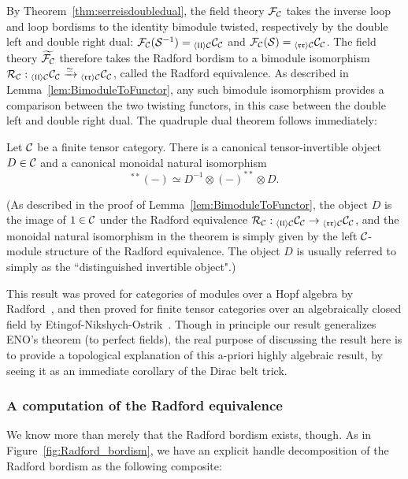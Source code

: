 \documentclass{amsart}
\begin{document}
By Theorem~\ref{thm:serreisdoubledual}, the field theory $\mathcal F_\mathcal C$ takes the inverse loop and loop bordisms to the identity bimodule twisted, respectively by the double left and double right dual: $\mathcal F_\mathcal C(\mathcal S^{-1}) = {}_{\langle \mathfrak{l l} \rangle \mathcal C} \mathcal C_\mathcal C$ and $\mathcal F_\mathcal C(\mathcal S) = {}_{\langle \mathfrak{r r} \rangle \mathcal C} \mathcal C_\mathcal C$.  The field theory $\widetilde{\mathcal F_\mathcal C}$ therefore takes the Radford bordism to a bimodule isomorphism $\mathcal R_\mathcal C : {}_{\langle \mathfrak{l l} \rangle \mathcal C} \mathcal C_\mathcal C \xrightarrow{\simeq} {}_{\langle \mathfrak{r r} \rangle \mathcal C} \mathcal C_\mathcal C$, called the Radford equivalence.  As described in Lemma~\ref{lem:BimoduleToFunctor}, any such bimodule isomorphism provides a comparison between the two twisting functors, in this case between the double left and double right dual.  The quadruple dual theorem follows immediately:
\begin{theorem} \label{thm:quaddual}
Let $\mathcal C$ be a finite tensor category.  There is a canonical tensor-invertible object $D \in \mathcal C$ and a canonical monoidal natural isomorphism
\[
{}^{**}(-) \simeq D^{-1} \otimes (-)^{**} \otimes D.
\]
\end{theorem}
\nid (As described in the proof of Lemma~\ref{lem:BimoduleToFunctor}, the object $D$ is the image of $1 \in \mathcal C$ under the Radford equivalence $\mathcal R_\mathcal C : {}_{\langle \mathfrak{l l} \rangle \mathcal C} \mathcal C_\mathcal C \rightarrow {}_{\langle \mathfrak{r r} \rangle \mathcal C} \mathcal C_\mathcal C$, and the monoidal natural isomorphism in the theorem is simply given by the left $\mathcal C$-module structure of the Radford equivalence.  The object $D$ is usually referred to simply as the ``distinguished invertible object".)  

This result was proved for categories of modules over a Hopf algebra by Radford~\cite{MR0407069}, and then proved for finite tensor categories over an algebraically closed field by Etingof-Nikshych-Ostrik~\cite{MR2097289}.  Though in principle our result generalizes ENO's theorem (to perfect fields), the real purpose of discussing the result here is to provide a topological explanation of this a-priori highly algebraic result, by seeing it as an immediate corollary of the Dirac belt trick.

\subsubsection{A computation of the Radford equivalence} \label{sec:computeradford}

We know more than merely that the Radford bordism exists, though.  As in Figure~\ref{fig:Radford_bordism}, we have an explicit handle decomposition of the Radford bordism as the following composite:
\end{document}
